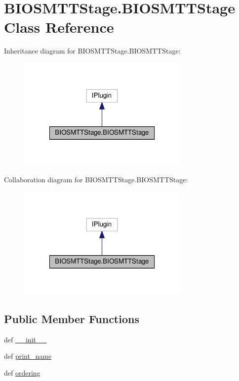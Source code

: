 \hypertarget{classBIOSMTTStage_1_1BIOSMTTStage}{\section{B\-I\-O\-S\-M\-T\-T\-Stage.\-B\-I\-O\-S\-M\-T\-T\-Stage Class Reference}
\label{classBIOSMTTStage_1_1BIOSMTTStage}
}


Inheritance diagram for B\-I\-O\-S\-M\-T\-T\-Stage.\-B\-I\-O\-S\-M\-T\-T\-Stage\-:
\nopagebreak
\begin{figure}[H]
\begin{center}
\leavevmode
\includegraphics[width=238pt]{classBIOSMTTStage_1_1BIOSMTTStage__inherit__graph}
\end{center}
\end{figure}


Collaboration diagram for B\-I\-O\-S\-M\-T\-T\-Stage.\-B\-I\-O\-S\-M\-T\-T\-Stage\-:
\nopagebreak
\begin{figure}[H]
\begin{center}
\leavevmode
\includegraphics[width=238pt]{classBIOSMTTStage_1_1BIOSMTTStage__coll__graph}
\end{center}
\end{figure}
\subsection*{Public Member Functions}
\begin{DoxyCompactItemize}
\item 
def \hyperlink{classBIOSMTTStage_1_1BIOSMTTStage_aa5f27b6db5d3b10cbd5d6e47de378e58}{\-\_\-\-\_\-init\-\_\-\-\_\-}
\item 
def \hyperlink{classBIOSMTTStage_1_1BIOSMTTStage_a4e5d3ca4920bd6825cdda7259fa85d52}{print\-\_\-name}
\item 
def \hyperlink{classBIOSMTTStage_1_1BIOSMTTStage_ae46a6ddd03499b39c15d164ea3643e48}{ordering}
\end{DoxyCompactItemize}


